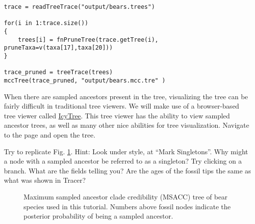 {\tt \begin{snugshade*}
\begin{lstlisting}
trace = readTreeTrace("output/bears.trees")

for(i in 1:trace.size())
{
    trees[i] = fnPruneTree(trace.getTree(i), pruneTaxa=v(taxa[17],taxa[20]))
}

trace_pruned = treeTrace(trees)
mccTree(trace_pruned, "output/bears.mcc.tre" )
\end{lstlisting}
\end{snugshade*}}

When there are sampled ancestors present in the tree, visualizing the tree can be fairly difficult in traditional tree viewers.
We will make use of a browser-based tree viewer called \href{http://tgvaughan.github.io/icytree/}{IcyTree}.
This tree viewer has the ability to view sampled ancestor trees, as well as many other nice abilities for tree visualization. Navigate to the page and open the tree. 

Try to replicate Fig. \ref{fig:IcyTreeSumm}. Hint: Look under style, at ``Mark Singletons''.
Why might a node with a sampled ancestor be referred to as a singleton?
Try clicking on a branch.
What are the fields telling you?
Are the ages of the fossil tips the same as what was shown in Tracer? 

\begin{figure}[h!]
\centering
{}
\caption{\small Maximum sampled ancestor clade credibility (MSACC) tree of bear species used in this tutorial. Numbers above fossil nodes indicate the posterior probability of being a sampled ancestor.}
\label{fig:IcyTreeSumm}
\end{figure}





